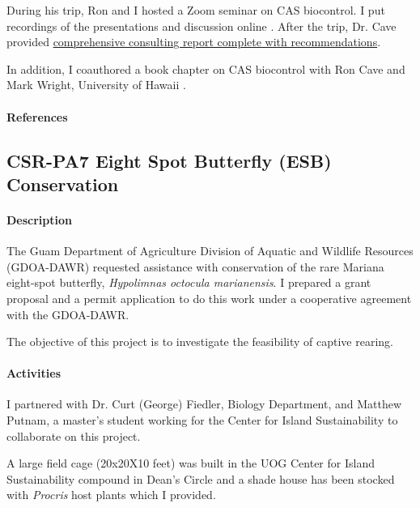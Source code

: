 \begin{refsection}
During his trip, Ron and I hosted a Zoom seminar on CAS biocontrol. I put recordings of the presentations and discussion online \cite{cave_biological_2022-1}. After the trip, Dr. Cave provided \href{https://github.com/aubreymoore/CAS-biocontrol-seminar/raw/main/Cave-CAS-report-2022.pdf}{comprehensive consulting report complete with recommendations}. 

In addition, I coauthored a book chapter on CAS biocontrol with Ron Cave and Mark Wright, University of Hawaii \cite{cave_biological_2022}.

\paragraph{References}
\printbibliography[heading=none]

\end{refsection}

\subsection{CSR-PA7 Eight Spot Butterfly (ESB) Conservation}

\paragraph{Description}

The Guam Department of Agriculture Division of Aquatic and Wildlife
Resources (GDOA-DAWR) requested assistance with conservation of the
rare Mariana eight-spot butterfly, \emph{Hypolimnas octocula marianensis}. I prepared a grant proposal and a permit application to do this work under a cooperative agreement with the GDOA-DAWR.

The objective of this project is to investigate the feasibility of captive rearing.

\paragraph{Activities}

I partnered with Dr. Curt (George) Fiedler, Biology Department, and Matthew Putnam, a master's student working for the Center for Island Sustainability to collaborate on this project.

A large field cage (20x20X10 feet) was built in the UOG Center for Island Sustainability compound in Dean's Circle and a shade house has been stocked with \textit{Procris} host plants which I provided. 

